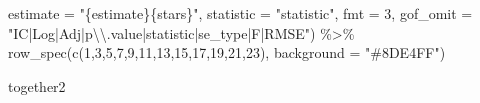 \documentclass[
  letterpaper,
  DIV=11,
  numbers=noendperiod]{scrartcl}
\newenvironment{Shaded}{\begin{snugshade}}{\end{snugshade}}
\newcommand{\AttributeTok}[1]{\textcolor[rgb]{0.40,0.45,0.13}{#1}}
\newcommand{\DecValTok}[1]{\textcolor[rgb]{0.68,0.00,0.00}{#1}}
\newcommand{\FunctionTok}[1]{\textcolor[rgb]{0.28,0.35,0.67}{#1}}
\newcommand{\NormalTok}[1]{\textcolor[rgb]{0.00,0.23,0.31}{#1}}
\newcommand{\SpecialCharTok}[1]{\textcolor[rgb]{0.37,0.37,0.37}{#1}}
\newcommand{\StringTok}[1]{\textcolor[rgb]{0.13,0.47,0.30}{#1}}
\begin{document}
\begin{Shaded}
\begin{Highlighting}[numbers=left,,]
             \AttributeTok{estimate =} \StringTok{"\{estimate\}\{stars\}"}\NormalTok{,}
             \AttributeTok{statistic =} \StringTok{"statistic"}\NormalTok{,}
             \AttributeTok{fmt =}  \DecValTok{3}\NormalTok{,}
             \AttributeTok{gof\_omit =} \StringTok{"IC|Log|Adj|p}\SpecialCharTok{\textbackslash{}\textbackslash{}}\StringTok{.value|statistic|se\_type|F|RMSE"}\NormalTok{) }\SpecialCharTok{\%\textgreater{}\%} 
  \FunctionTok{row\_spec}\NormalTok{(}\FunctionTok{c}\NormalTok{(}\DecValTok{1}\NormalTok{,}\DecValTok{3}\NormalTok{,}\DecValTok{5}\NormalTok{,}\DecValTok{7}\NormalTok{,}\DecValTok{9}\NormalTok{,}\DecValTok{11}\NormalTok{,}\DecValTok{13}\NormalTok{,}\DecValTok{15}\NormalTok{,}\DecValTok{17}\NormalTok{,}\DecValTok{19}\NormalTok{,}\DecValTok{21}\NormalTok{,}\DecValTok{23}\NormalTok{), }\AttributeTok{background =} \StringTok{"\#8DE4FF"}\NormalTok{) }

\NormalTok{together2}
\end{Highlighting}
\end{Shaded}
\end{document}
